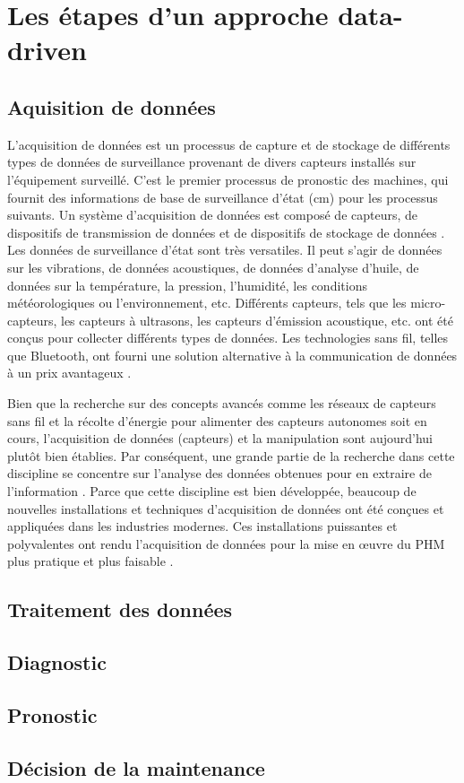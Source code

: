 \chapter{Les étapes d'un approche data-driven}

\section{Aquisition de données}
L'acquisition de données est un processus de capture et de stockage de différents types de données de surveillance provenant de divers capteurs installés sur l'équipement surveillé. C'est le premier processus de pronostic des machines, qui fournit des informations de base de surveillance d'état (\acrlong{cm}) pour les processus suivants. Un système d'acquisition de données est composé de capteurs, de dispositifs de transmission de données et de dispositifs de stockage de données \cite{Lei2018}. Les données de surveillance d'état sont très versatiles. Il peut s'agir de données sur les vibrations, de données acoustiques, de données d'analyse d'huile, de données sur la température, la pression, l'humidité, les conditions météorologiques ou l'environnement, etc. Différents capteurs, tels que les micro-capteurs, les capteurs à ultrasons, les capteurs d'émission acoustique, etc. ont été conçus pour collecter différents types de données. Les technologies sans fil, telles que Bluetooth, ont fourni une solution alternative à la communication de données à un prix avantageux \cite{Jardine2006}.

Bien que la recherche sur des concepts avancés comme les réseaux de capteurs sans fil et la récolte d’énergie pour alimenter des capteurs autonomes soit en cours, l’acquisition de données (capteurs) et la manipulation sont aujourd’hui plutôt bien établies. Par conséquent, une grande partie de la recherche dans cette discipline se concentre sur l’analyse des données obtenues pour en extraire de l’information \cite{Tinga2014}. Parce que cette discipline est bien développée, beaucoup de nouvelles installations et techniques d’acquisition de données ont été conçues et appliquées dans les industries modernes. Ces installations puissantes et polyvalentes ont rendu l’acquisition de données pour la mise en œuvre du PHM plus pratique et plus faisable \cite{Lei2016}.
\section{Traitement des données}
\section{Diagnostic}
\section{Pronostic}
\section{Décision de la maintenance}
